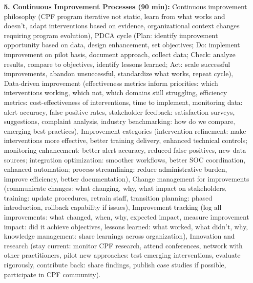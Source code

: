 \documentclass[11pt,a4paper]{article}
\begin{document}
\textbf{5. Continuous Improvement Processes (90 min):} Continuous improvement philosophy (CPF program iterative not static, learn from what works and doesn't, adapt interventions based on evidence, organizational context changes requiring program evolution), PDCA cycle (Plan: identify improvement opportunity based on data, design enhancement, set objectives; Do: implement improvement on pilot basis, document approach, collect data; Check: analyze results, compare to objectives, identify lessons learned; Act: scale successful improvements, abandon unsuccessful, standardize what works, repeat cycle), Data-driven improvement (effectiveness metrics inform priorities: which interventions working, which not, which domains still struggling, efficiency metrics: cost-effectiveness of interventions, time to implement, monitoring data: alert accuracy, false positive rates, stakeholder feedback: satisfaction surveys, suggestions, complaint analysis, industry benchmarking: how do we compare, emerging best practices), Improvement categories (intervention refinement: make interventions more effective, better training delivery, enhanced technical controls; monitoring enhancement: better alert accuracy, reduced false positives, new data sources; integration optimization: smoother workflows, better SOC coordination, enhanced automation; process streamlining: reduce administrative burden, improve efficiency, better documentation), Change management for improvements (communicate changes: what changing, why, what impact on stakeholders, training: update procedures, retrain staff, transition planning: phased introduction, rollback capability if issues), Improvement tracking (log all improvements: what changed, when, why, expected impact, measure improvement impact: did it achieve objectives, lessons learned: what worked, what didn't, why, knowledge management: share learnings across organization), Innovation and research (stay current: monitor CPF research, attend conferences, network with other practitioners, pilot new approaches: test emerging interventions, evaluate rigorously, contribute back: share findings, publish case studies if possible, participate in CPF community).
\end{document}

